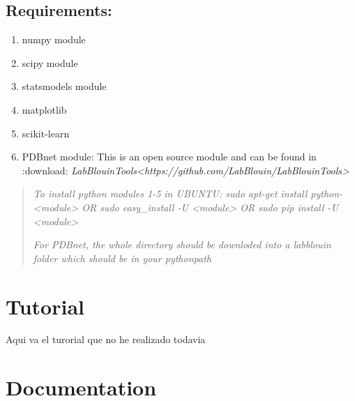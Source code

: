 \documentclass[letterpaper,10pt,english]{sphinxmanual}
\begin{document}
\section{Requirements:}
\label{Intro:requirements}\begin{enumerate}
\item {} 
numpy module

\item {} 
scipy module

\item {} 
statsmodels module

\item {} 
matplotlib

\item {} 
scikit-learn

\item {} 
PDBnet module: This is an open source module and can be found in :download: \emph{LabBlouinTools\textless{}https://github.com/LabBlouin/LabBlouinTools\textgreater{}}

\end{enumerate}
\begin{quote}

\emph{To install python modules 1-5 in UBUNTU: sudo apt-get install python-\textless{}module\textgreater{} OR  sudo easy\_install -U \textless{}module\textgreater{}  
OR sudo pip install -U \textless{}module\textgreater{}}

\emph{For PDBnet, the whole directory should be downloded into a labblouin folder which should be in your pythonpath}
\end{quote}


\chapter{Tutorial}
\label{Tutorial::doc}\label{Tutorial:tutorial}
Aqui va el turorial que no he realizado todavia


\chapter{Documentation}
\label{Doc:documentation}\label{Doc::doc}
\end{document}
